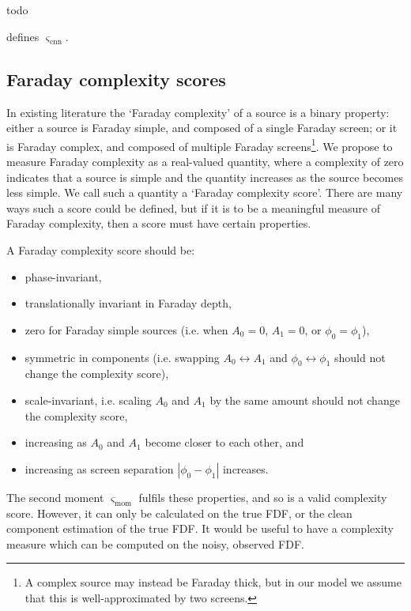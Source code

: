             todo

            defines $\varsigma_{\mathrm{cnn}}$.

    \subsection{Faraday complexity scores}
    \label{sec:scores-method}
    
        In existing literature the `Faraday complexity' of a source is a binary property: either a source is Faraday simple, and composed of a single Faraday screen; or it is Faraday complex, and composed of multiple Faraday screens\footnote{A complex source may instead be Faraday thick, but in our model we assume that this is well-approximated by two screens.}. We propose to measure Faraday complexity as a real-valued quantity, where a complexity of zero indicates that a source is simple and the quantity increases as the source becomes less simple. We call such a quantity a `Faraday complexity score'. There are many ways such a score could be defined, but if it is to be a meaningful measure of Faraday complexity, then a score must have certain properties.

        A Faraday complexity score should be:
        \begin{itemize}
            \item phase-invariant,
            \item translationally invariant in Faraday depth,
            \item zero for Faraday simple sources (i.e. when $A_0 = 0$, $A_1 = 0$, or $\phi_0 = \phi_1$),
            \item symmetric in components (i.e. swapping $A_0 \leftrightarrow A_1$ and $\phi_0 \leftrightarrow \phi_1$ should not change the complexity score),
            \item scale-invariant, i.e. scaling $A_0$ and $A_1$ by the same amount should not change the complexity score,
            \item increasing as $A_0$ and $A_1$ become closer to each other, and
            \item increasing as screen separation $|\phi_0 - \phi_1|$ increases.
        \end{itemize}

        The second moment $\varsigma_{\mathrm{mom}}$ fulfils these properties, and so is a valid complexity score. However, it can only be calculated on the true FDF, or the clean component estimation of the true FDF. It would be useful to have a complexity measure which can be computed on the noisy, observed FDF.

